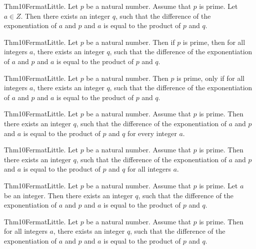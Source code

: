 \documentclass{article}
\begin{document}
Thm10FermatLittle. Let $p$ be a natural number. Assume that $p$ is prime. Let $a \in Z$. Then there exists an integer $q$, such that the difference of the exponentiation of $a$ and $p$ and $a$ is equal to the product of $p$ and $q$.

Thm10FermatLittle. Let $p$ be a natural number. Then if $p$ is prime, then for all integers $a$, there exists an integer $q$, such that the difference of the exponentiation of $a$ and $p$ and $a$ is equal to the product of $p$ and $q$.

Thm10FermatLittle. Let $p$ be a natural number. Then $p$ is prime, only if for all integers $a$, there exists an integer $q$, such that the difference of the exponentiation of $a$ and $p$ and $a$ is equal to the product of $p$ and $q$.

Thm10FermatLittle. Let $p$ be a natural number. Assume that $p$ is prime. Then there exists an integer $q$, such that the difference of the exponentiation of $a$ and $p$ and $a$ is equal to the product of $p$ and $q$ for every integer $a$.

Thm10FermatLittle. Let $p$ be a natural number. Assume that $p$ is prime. Then there exists an integer $q$, such that the difference of the exponentiation of $a$ and $p$ and $a$ is equal to the product of $p$ and $q$ for all integers $a$.

Thm10FermatLittle. Let $p$ be a natural number. Assume that $p$ is prime. Let $a$ be an integer. Then there exists an integer $q$, such that the difference of the exponentiation of $a$ and $p$ and $a$ is equal to the product of $p$ and $q$.

Thm10FermatLittle. Let $p$ be a natural number. Assume that $p$ is prime. Then for all integers $a$, there exists an integer $q$, such that the difference of the exponentiation of $a$ and $p$ and $a$ is equal to the product of $p$ and $q$.
\end{document}
